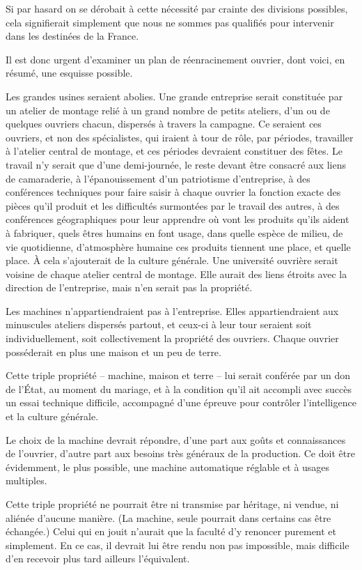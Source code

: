 \documentclass[french,twoside]{book} %
\begin{document}
Si par hasard on se dérobait à cette nécessité par crainte des divisions possibles, cela signifierait simplement que nous ne sommes pas qualifiés pour intervenir dans les destinées de la France.\par
Il est donc urgent d'examiner un plan de réenracinement ouvrier, dont voici, en résumé, une esquisse possible.\par
Les grandes usines seraient abolies. Une grande entreprise serait constituée par un atelier de montage relié à un grand nombre de petits ateliers, d'un ou de quelques ouvriers chacun, dispersés à travers la campagne. Ce seraient ces ouvriers, et non des spécialistes, qui iraient à tour de rôle, par périodes, travailler à l'atelier central de montage, et ces périodes devraient constituer des fêtes. Le travail n'y serait que d'une demi-journée, le reste devant être consacré aux liens de camaraderie, à l'épanouissement d'un patriotisme d'entreprise, à des conférences techniques pour faire saisir à chaque ouvrier la fonction exacte des pièces qu'il produit et les difficultés surmontées par le travail des autres, à des conférences géographiques pour leur apprendre où vont les produits qu'ils aident à fabriquer, quels êtres humains en font usage, dans quelle espèce de milieu, de vie quotidienne, d'atmosphère humaine ces produits tiennent une place, et quelle place. À cela s'ajouterait de la culture générale. Une université ouvrière serait voisine de chaque atelier central de montage. Elle aurait des liens étroits avec la direction de l'entreprise, mais n'en serait pas la propriété.\par
Les machines n'appartiendraient pas à l'entreprise. Elles appartiendraient aux minuscules ateliers dispersés partout, et ceux-ci à leur tour seraient soit individuellement, soit collectivement la propriété des ouvriers. Chaque ouvrier posséderait en plus une maison et un peu de terre.\par
Cette triple propriété – machine, maison et terre – lui serait conférée par un don de l'État, au moment du mariage, et à la condition qu'il ait accompli avec succès un essai technique difficile, accompagné d'une épreuve pour contrôler l'intelligence et la culture générale.\par
Le choix de la machine devrait répondre, d'une part aux goûts et connaissances de l'ouvrier, d'autre part aux besoins très généraux de la production. Ce doit être évidemment, le plus possible, une machine automatique réglable et à usages multiples.\par
Cette triple propriété ne pourrait être ni transmise par héritage, ni vendue, ni aliénée d'aucune manière. (La machine, seule pourrait dans certains cas être échangée.) Celui qui en jouit n'aurait que la faculté d'y renoncer purement et simplement. En ce cas, il devrait lui être rendu non pas impossible, mais difficile d'en recevoir plus tard ailleurs l'équivalent.\par
\end{document}
